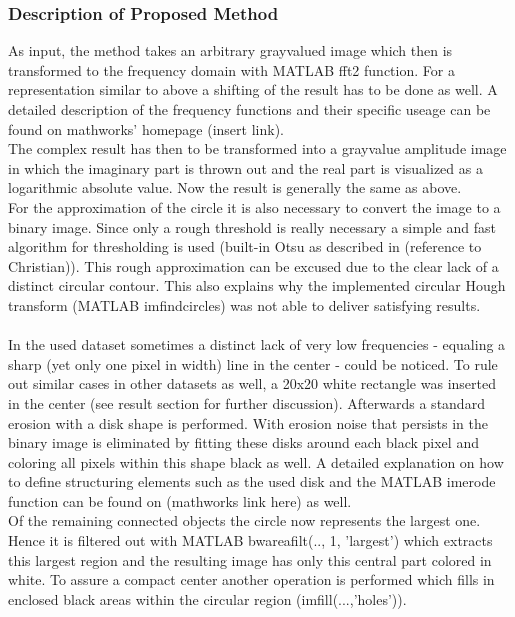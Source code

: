 \documentclass{article}
\begin{document}
\subsubsection{Description of Proposed Method}\label{sec:Description of Proposed Method}
As input, the method takes an arbitrary grayvalued image which then is transformed to the frequency domain with MATLAB fft2 function. For a representation similar to above a shifting of the result has to be done as well. A detailed description of the frequency functions and their specific useage can be found on mathworks' homepage (insert link). \\
The complex result has then to be transformed into a grayvalue amplitude image in which the imaginary part is thrown out and the real part is visualized as a logarithmic absolute value. Now the result is generally the same as above. \\
For the approximation of the circle it is also necessary to convert the image to a binary image. Since only a rough threshold is really necessary a simple and fast algorithm for thresholding is used (built-in Otsu as described in (reference to Christian)). This rough approximation can be excused due to the clear lack of a distinct circular contour. This also explains why the implemented circular Hough transform (MATLAB imfindcircles) was not able to deliver satisfying results.\\
\\
In the used dataset sometimes a distinct lack of very low frequencies - equaling a sharp (yet only one pixel in width) line in the center - could be noticed. To rule out similar cases in other datasets as well, a 20x20 white rectangle was inserted in the center (see result section for further discussion).
Afterwards a standard erosion with a disk shape is performed. With erosion noise that persists in the binary image is eliminated by fitting these disks around each black pixel and coloring all pixels within this shape black as well. A detailed explanation on how to define structuring elements such as the used disk and the MATLAB imerode function can be found on (mathworks link here) as well. \\
Of the remaining connected objects the circle now represents the largest one. Hence it is filtered out with MATLAB bwareafilt(.., 1, 'largest') which extracts this largest region and the resulting image has only this central part colored in white. To assure a compact center another operation is performed which fills in enclosed black areas within the circular region (imfill(...,'holes')). \\
\end{document}
